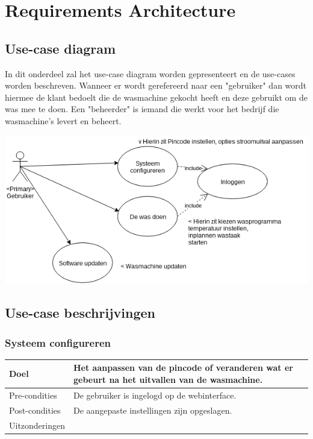 \chapter{Requirements Architecture}
\section{Use-case diagram}
In dit onderdeel zal het use-case diagram worden gepresenteert en de use-cases worden beschreven.
Wanneer er wordt gerefereerd naar een "gebruiker" dan wordt hiermee de klant bedoelt die de wasmachine gekocht heeft en deze gebruikt om de was mee te doen.
Een "beheerder" is iemand die werkt voor het bedrijf die wasmachine's levert en beheert.

\scalebox{0.7} {
	\includegraphics{Chapters/usage1.png}
}

\section{Use-case beschrijvingen}

	\subsection{Systeem configureren}
	\begin{center}
	  \begin{tabular}{ | p{4cm} | p{8.5cm} | }    \hline
		Doel & Het aanpassen van de pincode of veranderen wat er gebeurt na het uitvallen van de wasmachine. \\ \hline
		Pre-condities & De gebruiker is ingelogd op de webinterface. \\ \hline
		Post-condities & De aangepaste instellingen zijn opgeslagen. \\ \hline
		Uitzonderingen & \\
		\hline
	  \end{tabular}
	\end{center}


